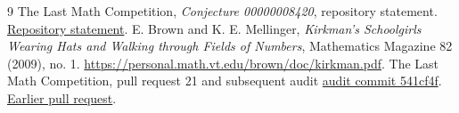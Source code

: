 \documentclass[11pt]{article}
\begin{document}
\begin{thebibliography}{9}
 The Last Math Competition,
\emph{Conjecture 00000008420}, repository statement.
\href{https://github.com/The-Last-Math-Competition/The-Last-Math-Competition/blob/d7d4bc9f6918401d3fb22c6e473df63eba5dbb78/conjectures/00000008420.md}{Repository statement}.
 E. Brown and K. E. Mellinger,
\emph{Kirkman's Schoolgirls Wearing Hats and Walking through Fields of Numbers},
Mathematics Magazine 82 (2009), no. 1.
\url{https://personal.math.vt.edu/brown/doc/kirkman.pdf}.
 The Last Math Competition, pull request 21 and subsequent audit
\href{https://github.com/The-Last-Math-Competition/The-Last-Math-Competition/commit/541cf4fbc7aef3e17085577f6403c11c09f31fe1}{audit commit 541cf4f}.
\href{https://github.com/The-Last-Math-Competition/The-Last-Math-Competition/pull/21}{Earlier pull request}.
\end{thebibliography}
\end{document}

